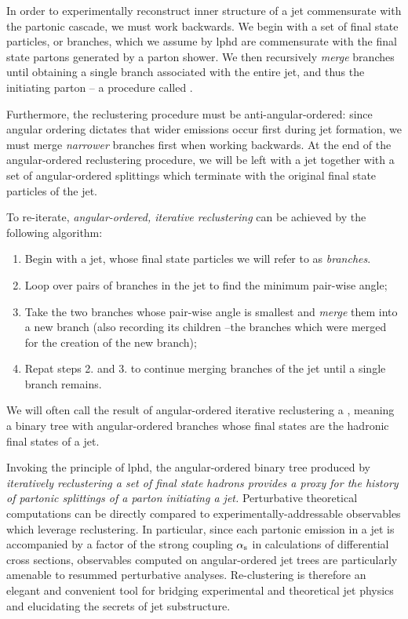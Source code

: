 In order to experimentally reconstruct inner structure of a jet commensurate with the partonic cascade, we must work backwards.
%
We begin with a set of final state particles, or branches, which we assume by \gls{lphd} are commensurate with the final state partons generated by a parton shower.
%
We then recursively \textit{merge} branches until obtaining a single branch associated with the entire jet, and thus the initiating parton -- a procedure called .



Furthermore, the \gls{reclustering} procedure must be anti-angular-ordered:
%
since angular ordering dictates that wider emissions occur first during jet formation, we must merge \textit{narrower} branches first when working backwards.
%
At the end of the angular-ordered \gls{reclustering} procedure, we will be left with a jet together with a set of angular-ordered splittings which terminate with the original final state particles of the jet.


To re-iterate, \textit{angular-ordered, iterative \gls{reclustering}} can be achieved by the following algorithm:
\begin{enumerate}
    \item
    Begin with a jet, whose final state particles we will refer to as \emph{branches}.

    \item
    Loop over pairs of branches in the jet to find the minimum pair-wise angle;

    \item
    Take the two branches whose pair-wise angle is smallest and \emph{merge} them into a new branch (also recording its children --the branches which were merged for the creation of the new branch);

    \item
    Repat steps 2. and 3. to continue merging branches of the jet until a single branch remains.
\end{enumerate}
%
We will often call the result of angular-ordered iterative \gls{reclustering} a , meaning a binary tree with angular-ordered branches whose final states are the hadronic final states of a jet.


Invoking the principle of \gls{lphd}, the angular-ordered binary tree produced by \textit{iteratively \gls{reclustering} a set of final state hadrons provides a proxy for the history of partonic splittings of a parton initiating a jet.}
%
Perturbative theoretical computations can be directly compared to experimentally-addressable observables which leverage \gls{reclustering}.
%
In particular, since each partonic emission in a jet is accompanied by a factor of the strong coupling \(\alpha_{\mathrm{s}}\) in calculations of differential cross sections, observables computed on angular-ordered jet trees are particularly amenable to resummed perturbative analyses.
%
Re-clustering is therefore an elegant and convenient tool for bridging experimental and theoretical jet physics and elucidating the secrets of jet substructure.




